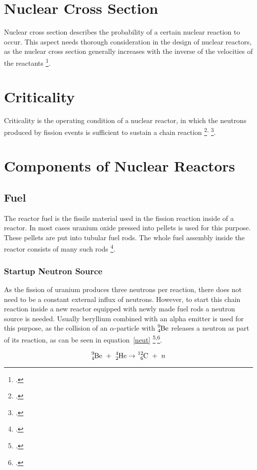 \section{Nuclear Cross Section}
Nuclear cross section describes the probability of a certain nuclear reaction to occur. This
aspect needs thorough consideration in the design of nuclear reactors, as the nuclear cross section
generally increases with the inverse of the velocities of the reactants \footcite[108]{nucfundamentals}.

\section{Criticality}
Criticality is the operating condition of a nuclear reactor, in which the neutrons produced by fission
events is sufficient to sustain a chain reaction \footcite[308]{nucfundamentals}\textsuperscript{,} \footcite[39]{ReactorPhysics}.

\section{Components of Nuclear Reactors}
\subsection{Fuel}
The reactor fuel is the fissile material used in the fission reaction inside of a reactor. In
most cases uranium oxide  pressed into pellets is used for this purpose. These
pellets are put into tubular fuel rods. The whole fuel assembly inside the reactor consists of many
such rods \footcite{WNPR}.
\subsubsection{Startup Neutron Source}
As the fission of uranium produces three neutrons per reaction, there does not need to be
a constant external influx of neutrons. However, to start this chain reaction inside a new reactor
equipped with newly made fuel rods a neutron source is needed. Usually beryllium combined with an
alpha emitter is used for this purpose, as the collision of an $\alpha$-particle with $\ce{^{9}_{4}Be}$
releases a neutron as part of its reaction, as can be seen in equation~\ref{neut} \footcite{WNPR}\textsuperscript{,}\footcite[100]{nucfundamentals}.

\begin{equation}
    \label{neut}
    \ce{^{9}_{4}Be} ~+~ \ce{^{4}_{2}He} \rightarrow \ce{^{12}_{6}C} ~+~ n
\end{equation}

